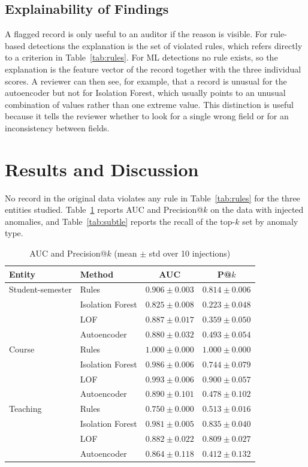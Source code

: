 \documentclass[conference]{IEEEtran}
\begin{document}
\subsection{Explainability of Findings}
A flagged record is only useful to an auditor if the reason is visible. For rule-based detections the explanation is the set of violated rules, which refers directly to a criterion in Table~\ref{tab:rules}. For ML detections no rule exists, so the explanation is the feature vector of the record together with the three individual scores. A reviewer can then see, for example, that a record is unusual for the autoencoder but not for Isolation Forest, which usually points to an unusual combination of values rather than one extreme value. This distinction is useful because it tells the reviewer whether to look for a single wrong field or for an inconsistency between fields.

\section{Results and Discussion}\label{sec:results}
No record in the original data violates any rule in Table~\ref{tab:rules} for the three entities studied. Table~\ref{tab:auc} reports AUC and Precision@$k$ on the data with injected anomalies, and Table~\ref{tab:subtle} reports the recall of the top-$k$ set by anomaly type.

\begin{table}[htbp]
\caption{AUC and Precision@$k$ (mean $\pm$ std over 10 injections)}
\begin{center}
\footnotesize\setlength{\tabcolsep}{3pt}
\begin{tabular}{llcc}
\toprule
\textbf{Entity} & \textbf{Method} & \textbf{AUC} & \textbf{P@$k$} \\
\midrule
Student-semester & Rules & $0.906\pm0.003$ & $0.814\pm0.006$ \\
 & Isolation Forest & $0.825\pm0.008$ & $0.223\pm0.048$ \\
 & LOF & $0.887\pm0.017$ & $0.359\pm0.050$ \\
 & Autoencoder & $0.880\pm0.032$ & $0.493\pm0.054$ \\
\midrule
Course & Rules & $1.000\pm0.000$ & $1.000\pm0.000$ \\
 & Isolation Forest & $0.986\pm0.006$ & $0.744\pm0.079$ \\
 & LOF & $0.993\pm0.006$ & $0.900\pm0.057$ \\
 & Autoencoder & $0.890\pm0.101$ & $0.478\pm0.102$ \\
\midrule
Teaching & Rules & $0.750\pm0.000$ & $0.513\pm0.016$ \\
 & Isolation Forest & $0.981\pm0.005$ & $0.835\pm0.040$ \\
 & LOF & $0.882\pm0.022$ & $0.809\pm0.027$ \\
 & Autoencoder & $0.864\pm0.118$ & $0.412\pm0.132$ \\
\bottomrule
\end{tabular}
\label{tab:auc}
\end{center}
\end{table}
\end{document}
